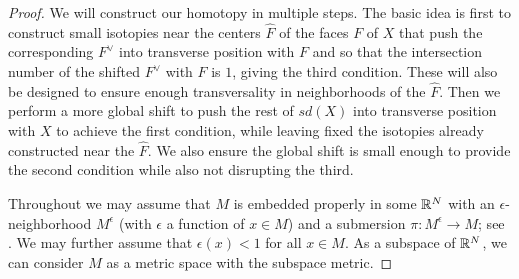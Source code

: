 \begin{proof}
	We will construct our homotopy in multiple steps.
	The basic idea is first to construct small isotopies near the centers $\hat F$ of the faces $F$ of $X$ that push the corresponding $F^\vee$ into transverse position with $F$ and so that the intersection number of the shifted $F^\vee$ with $F$ is $1$, giving the third condition.
	These will also be designed to ensure enough transversality in neighborhoods of the $\hat F$.
	Then we perform a more global shift to push the rest of $sd(X)$ into transverse position with $X$ to achieve the first condition, while leaving fixed the isotopies already constructed near the $\hat F$.
	We also ensure the global shift is small enough to provide the second condition while also not disrupting the third.

	Throughout we may assume that $M$ is embedded properly in some $\mathbb{R}^N$ with an $\epsilon$-neighborhood $M^\epsilon$ (with $\epsilon$ a function of $x \in M$) and a submersion $\pi \colon M^\epsilon \to M$; see \cite[Section 2.3]{GuPo74}.
	We may further assume that $\epsilon(x) < 1$ for all $x \in M$.
	As a subspace of $\mathbb{R}^N$, we can consider $M$ as a metric space with the subspace metric.


\end{proof}
